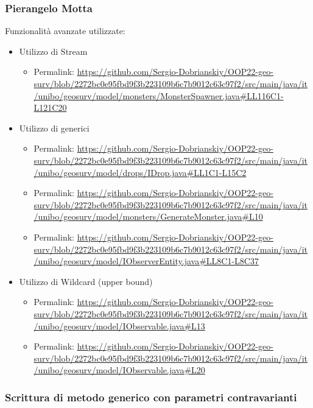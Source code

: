\documentclass[a4paper,12pt]{report}
\begin{document}
\subsubsection{Pierangelo Motta}
Funzionalità avanzate utilizzate:
 \begin{itemize}
 	\item Utilizzo di Stream
 	 \begin{itemize}
 	 	\item Permalink: \url{https://github.com/Sergio-Dobrianskiy/OOP22-geo-surv/blob/2272bc0e95fbd9f3b223109b6c7b9012c63c97f2/src/main/java/it/unibo/geosurv/model/monsters/MonsterSpawner.java#LL116C1-L121C20}
 	 \end{itemize}
 	 
 	\item Utilizzo di generici
 	 \begin{itemize}
 	 	\item Permalink: \url{https://github.com/Sergio-Dobrianskiy/OOP22-geo-surv/blob/2272bc0e95fbd9f3b223109b6c7b9012c63c97f2/src/main/java/it/unibo/geosurv/model/drops/IDrop.java#LL1C1-L15C2}
 	 	\item Permalink: \url{https://github.com/Sergio-Dobrianskiy/OOP22-geo-surv/blob/2272bc0e95fbd9f3b223109b6c7b9012c63c97f2/src/main/java/it/unibo/geosurv/model/monsters/GenerateMonster.java#L10}
 	 	 	 	\item Permalink: \url{https://github.com/Sergio-Dobrianskiy/OOP22-geo-surv/blob/2272bc0e95fbd9f3b223109b6c7b9012c63c97f2/src/main/java/it/unibo/geosurv/model/IObserverEntity.java#LL8C1-L8C37}
 	 \end{itemize}
	\item Utilizzo di Wildcard (upper bound)
 	\begin{itemize}
 	 	\item Permalink: \url{https://github.com/Sergio-Dobrianskiy/OOP22-geo-surv/blob/2272bc0e95fbd9f3b223109b6c7b9012c63c97f2/src/main/java/it/unibo/geosurv/model/IObservable.java#L13}
 	\end{itemize}
 	\begin{itemize}
 	 	\item Permalink: \url{https://github.com/Sergio-Dobrianskiy/OOP22-geo-surv/blob/2272bc0e95fbd9f3b223109b6c7b9012c63c97f2/src/main/java/it/unibo/geosurv/model/IObservable.java#L20}
 	\end{itemize}
	
\end{itemize}


\subsubsection{Scrittura di metodo generico con parametri contravarianti}
\end{document}
